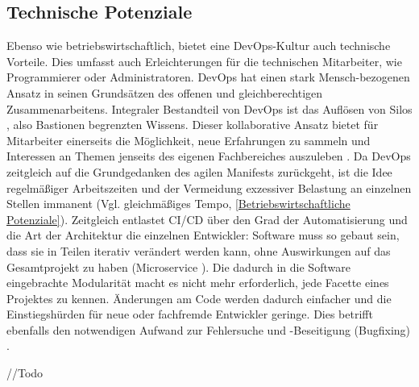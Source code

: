 \subsection{Technische Potenziale}
\label{Technische Potenziale}
Ebenso wie betriebswirtschaftlich, bietet eine \gls{DevOps}-Kultur auch technische Vorteile. Dies umfasst auch Erleichterungen für die technischen Mitarbeiter, wie Programmierer oder Administratoren. \gls{DevOps} hat einen stark Mensch-bezogenen Ansatz in seinen Grundsätzen des offenen und gleichberechtigen Zusammenarbeitens. Integraler Bestandteil von \gls{DevOps} ist das Auflösen von \glqq{}Silos\grqq{} \cite{leite_survey_2020}, also Bastionen begrenzten Wissens. Dieser kollaborative Ansatz bietet für Mitarbeiter einerseits die Möglichkeit, neue Erfahrungen zu sammeln und Interessen an Themen jenseits des eigenen Fachbereiches auszuleben \cite{leite_survey_2020}. Da \gls{DevOps} zeitgleich auf die Grundgedanken des agilen Manifests zurückgeht, ist die Idee regelmäßiger Arbeitszeiten und der Vermeidung exzessiver Belastung an einzelnen Stellen immanent (Vgl. \glqq{}gleichmäßiges Tempo\grqq{}, \ref{Betriebswirtschaftliche Potenziale}).
Zeitgleich entlastet \acrshort{CI}/\acrshort{CD} über den Grad der Automatisierung und die Art der Architektur die einzelnen Entwickler: Software muss so gebaut sein, dass sie in Teilen iterativ verändert werden kann, ohne Auswirkungen auf das Gesamtprojekt zu haben (\glqq{}Microservice\grqq{} \cite[S. 14]{leite_survey_2020}). Die dadurch in die Software eingebrachte Modularität macht es nicht mehr erforderlich, jede Facette eines Projektes zu kennen. Änderungen am Code werden dadurch einfacher und die Einstiegshürden für neue oder fachfremde Entwickler geringe. Dies betrifft ebenfalls den notwendigen Aufwand zur Fehlersuche und -Beseitigung (Bugfixing) \cite{hilton_usage_2016}.

//Todo
